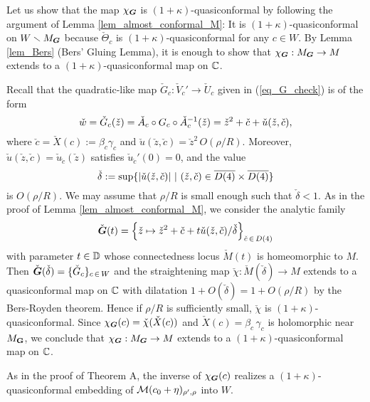 Let us show that the map $\chi_{\boldsymbol{G}}$ is $(1+\kappa)$-quasiconformal
by following the argument of Lemma \ref{lem_almost_conformal_M}:
It is $(1+\kappa)$-quasiconformal 
on $W \smallsetminus  M_{\boldsymbol{G}}$ because 
$\check{\Theta}_c$ is $(1+\kappa)$-quasiconformal for any $c \in W$.
By Lemma \ref{lem_Bers} (Bers' Gluing Lemma),
it is enough to show that
$\chi_{\boldsymbol{G}}: M_{\boldsymbol{G}} \to M$
extends to a $(1+\kappa)$-quasiconformal map on $\mathbb C$. 

Recall that 
the quadratic-like map $\check{G}_c:\check{V}_c' \to \check{U}_c$
given in (\ref{eq_G_check}) is of the form 
$$
\check{w}=\check{G}_c(\check{z})=
\check{A}_c \circ G_c \circ \check{A}_c^{-1}(\check{z})
=\check{z}^2 +\check{c}+\check{u}(\check{z},\check{c}),
$$
where $\check{c}=\check{X}(c):=\beta_c\gamma_c$ and 
$\check{u}(\check{z},\check{c})=\check{z}^2 \,O(\rho/R)$.
Moreover, $\check{u}(\check{z},\check{c}) =\check{u}_{\check{c}}(\check{z})$
 satisfies $\check{u}_{\check{c}}'(0)=0$,
 and the value 
$$
\check{\delta}:=
\sup \{|\check{u}(\check{z},\check{c})| \ | \  (\check{z},\check{c}) 
\in \overline{D(4)}\times \overline{D(4)}\}
$$
is $O(\rho/R)$.
We may assume that $\rho/R$ is small enough such that $\check{\delta}<1$.
As in the proof of Lemma \ref{lem_almost_conformal_M},
we consider the analytic family
$$
\check{\boldsymbol{G}}(t)=
{\left\{ \check{z} \mapsto \check{z}^2+\check{c}
+t \check{u}(\check{z},\check{c})/\check{\delta} \right\}}_{\check{c}\, \in \, D(4)}
$$
with parameter $t \in \mathbb D$ 
whose connectedness locus $\check{M}(t)$ is homeomorphic to $M$.
Then $\check{\boldsymbol{G}}(\check{\delta})=\{\check{G}_c\}_{c \,\in \, W}$
and the straightening map 
$\check{\chi}:\check{M}(\check{\delta}) \to M$ 
extends to a quasiconformal map on $\mathbb C$
with dilatation $1+O(\check{\delta})=1+O(\rho/R)$
by the Bers-Royden theorem.
Hence if $\rho/R$ is sufficiently small, 
$\check{\chi}$ is $(1+\kappa)$-quasiconformal.
Since $\chi_{\boldsymbol{G}}(c) =\check{\chi}(\check{X}(c))$ and
$\check{X}(c)=\beta_c \,\gamma_c$ is holomorphic near $M_{\bf G}$,
we conclude that $\chi_{\boldsymbol{G}}: M_{\boldsymbol{G}} \to M$
extends to a $(1+\kappa)$-quasiconformal map on $\mathbb C$.


As in the proof of Theorem A, the inverse of $\chi_{\boldsymbol{G}}(c)$ 
realizes a $(1+\kappa)$-quasiconformal embedding of 
${\mathcal{M}}(c_0+\eta)_{\rho',\rho}$ into $W$.
\QED

\medskip 

